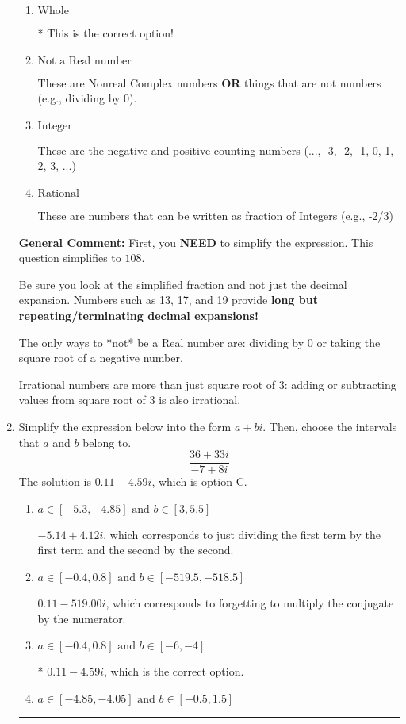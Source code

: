 \documentclass{extbook}[14pt]
\newcommand{\litem}[1]{\item #1

\rule{\textwidth}{0.4pt}}
\begin{document}
\begin{enumerate}
{\begin{enumerate}[label=\Alph*.]
These cannot be written as a fraction of Integers.
\item \( \text{Whole} \)

* This is the correct option!
\item \( \text{Not a Real number} \)

These are Nonreal Complex numbers \textbf{OR} things that are not numbers (e.g., dividing by 0).
\item \( \text{Integer} \)

These are the negative and positive counting numbers (..., -3, -2, -1, 0, 1, 2, 3, ...)
\item \( \text{Rational} \)

These are numbers that can be written as fraction of Integers (e.g., -2/3)
\end{enumerate}

\textbf{General Comment:} First, you \textbf{NEED} to simplify the expression. This question simplifies to $108$. 
 
 Be sure you look at the simplified fraction and not just the decimal expansion. Numbers such as 13, 17, and 19 provide \textbf{long but repeating/terminating decimal expansions!} 
 
 The only ways to *not* be a Real number are: dividing by 0 or taking the square root of a negative number. 
 
 Irrational numbers are more than just square root of 3: adding or subtracting values from square root of 3 is also irrational.
}
\litem{
Simplify the expression below into the form $a+bi$. Then, choose the intervals that $a$ and $b$ belong to.
\[ \frac{36 + 33 i}{-7 + 8 i} \]The solution is \( 0.11  - 4.59 i \), which is option C.\begin{enumerate}[label=\Alph*.]
\item \( a \in [-5.3, -4.85] \text{ and } b \in [3, 5.5] \)

 $-5.14  + 4.12 i$, which corresponds to just dividing the first term by the first term and the second by the second.
\item \( a \in [-0.4, 0.8] \text{ and } b \in [-519.5, -518.5] \)

 $0.11  - 519.00 i$, which corresponds to forgetting to multiply the conjugate by the numerator.
\item \( a \in [-0.4, 0.8] \text{ and } b \in [-6, -4] \)

* $0.11  - 4.59 i$, which is the correct option.
\item \( a \in [-4.85, -4.05] \text{ and } b \in [-0.5, 1.5] \)


\end{enumerate}}
\end{enumerate}
\end{document}
